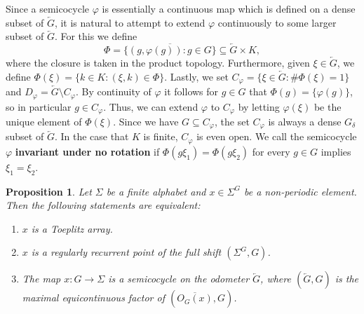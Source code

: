 \documentclass[titlepage,reqno,10pt]{amsart}
\newtheorem{proposition}[theorem]{Proposition}
\theoremstyle{definition}
\newcommand{\tm}{\subseteq}
\begin{document}
Since a semicocycle $\varphi$ is essentially a continuous map which is defined on a dense subset of $\overleftarrow{G}$, it is natural to attempt to extend $\varphi$ continuously to some larger subset of $\overleftarrow{G}$. 
For this we define
$$ \Phi = \overline{\{(g,\varphi(g)):g\in G\}} \tm \overleftarrow{G} \times K,$$
where the closure is taken in the product topology.
Furthermore, given $\xi \in \overleftarrow{G}$, we define $\Phi(\xi) = \{k\in K:(\xi,k)\in \Phi\}$.
Lastly, we set $C_\varphi= \{\xi\in \overleftarrow{G}:\# \Phi(\xi) = 1\}$ and $D_\varphi = \overleftarrow{G}\setminus C_\varphi$. 
By continuity of $\varphi$ it follows for $g\in G$ that $\Phi(g) = \{\varphi(g)\}$, so in particular $g\in C_\varphi$.
Thus, we can extend $\varphi$ to $C_\varphi$ by letting $\varphi(\xi)$ be the unique element of $\Phi(\xi)$.
Since we have $G\subseteq C_\varphi$, the set $C_\varphi$ is always a dense $G_\delta$ subset of $\overleftarrow{G}$. 
In the case that $K$ is finite, $C_\varphi$ is even open.
We call the semicocycle $\varphi$ {\bf invariant under no rotation} if %
$\Phi(g\xi_1)=\Phi(g\xi_2)$ for every $g\in G$ implies $\xi_1=\xi_2$. %

\begin{proposition}\label{semicocycles_toeplitz}
Let $\Sigma$ be  a finite alphabet and $x\in \Sigma^G$ be a non-periodic element. Then the following statements are equivalent:
\begin{enumerate}
\item $x$ is a   Toeplitz array.

\item $x$ is a regularly recurrent point of the full shift $(\Sigma^G,G)$.

\item The map $x:G\to \Sigma$  is a semicocycle on the odometer $\overleftarrow{G}$, where $(\overleftarrow{G},G)$ is the maximal equicontinuous factor of $(\overline{O_G(x)},G)$.
\end{enumerate}
\end{proposition}
\end{document}
